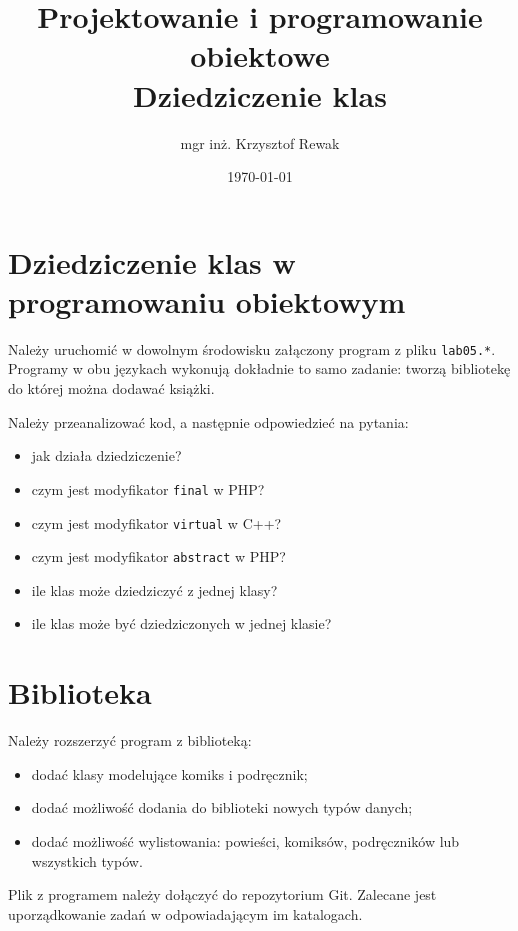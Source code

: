 \documentclass{article}
\title{
	Projektowanie i programowanie obiektowe \\
	\Huge{Dziedziczenie klas}
}
\author{mgr inż. Krzysztof Rewak}
\date{\today}
\begin{document}
	\maketitle

	\section{Dziedziczenie klas w programowaniu obiektowym}	
	Należy uruchomić w dowolnym środowisku załączony program z pliku \texttt{lab05.*}. Programy w obu językach wykonują dokładnie to samo zadanie: tworzą bibliotekę do której można dodawać książki.
	
	Należy przeanalizować kod, a następnie odpowiedzieć na pytania:
	\begin{itemize}
		\item jak działa dziedziczenie?
		\item czym jest modyfikator \texttt{final} w PHP?
		\item czym jest modyfikator \texttt{virtual} w C++?
		\item czym jest modyfikator \texttt{abstract} w PHP?
		\item ile klas może dziedziczyć z jednej klasy?
		\item ile klas może być dziedziczonych w jednej klasie?
	\end{itemize}

	\section{Biblioteka}
	Należy rozszerzyć program z biblioteką:
	\begin{itemize}
		\item dodać klasy modelujące komiks i podręcznik;
		\item dodać możliwość dodania do biblioteki nowych typów danych;
		\item dodać możliwość wylistowania: powieści, komiksów, podręczników lub wszystkich typów.
	\end{itemize}
	
	Plik z programem należy dołączyć do repozytorium Git. Zalecane jest uporządkowanie zadań w odpowiadającym im katalogach.
\end{document}
